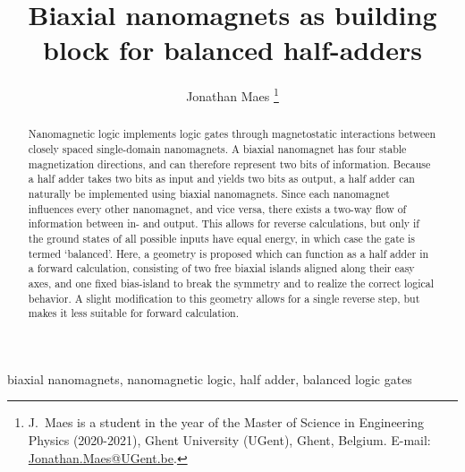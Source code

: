 \documentclass[twocolumn]{phdsymp}
\begin{document}
\title{Biaxial nanomagnets as building block for balanced half-adders}

\author{Jonathan Maes \thanks{J.~Maes is a student in the  year of the Master of Science in Engineering Physics (2020-2021), Ghent University (UGent), Ghent, Belgium. E-mail: \href{mailto:Jonathan.Maes@UGent.be}{Jonathan.Maes@UGent.be}.}}


\maketitle

\begin{abstract}
Nanomagnetic logic implements logic gates through magnetostatic interactions between closely spaced single-domain nanomagnets. A biaxial nanomagnet has four stable magnetization directions, and can therefore represent two bits of information. Because a half adder takes two bits as input and yields two bits as output, a half adder can naturally be implemented using biaxial nanomagnets. Since each nanomagnet influences every other nanomagnet, and vice versa, there exists a two-way flow of information between in- and output. This allows for reverse calculations, but only if the ground states of all possible inputs have equal energy, in which case the gate is termed `balanced'. Here, a geometry is proposed which can function as a half adder in a forward calculation, consisting of two free biaxial islands aligned along their easy axes, and one fixed bias-island to break the symmetry and to realize the correct logical behavior. A slight modification to this geometry allows for a single reverse step, but makes it less suitable for forward calculation.
\end{abstract}

\begin{keywords}
biaxial nanomagnets, nanomagnetic logic, half adder, balanced logic gates
\end{keywords}
\end{document}
